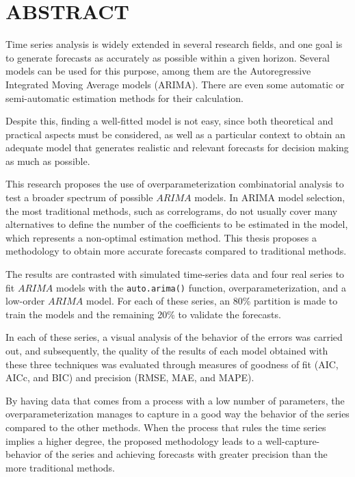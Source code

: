 \documentclass[
]{article}
\begin{document}
\cleardoublepage

\section*{ABSTRACT}

Time series analysis is widely extended in several research fields, and
one goal is to generate forecasts as accurately as possible within a
given horizon. Several models can be used for this purpose, among them
are the Autoregressive Integrated Moving Average models (ARIMA). There
are even some automatic or semi-automatic estimation methods for their
calculation.

Despite this, finding a well-fitted model is not easy, since both
theoretical and practical aspects must be considered, as well as a
particular context to obtain an adequate model that generates realistic
and relevant forecasts for decision making as much as possible.

This research proposes the use of overparameterization combinatorial
analysis to test a broader spectrum of possible \(ARIMA\) models. In
ARIMA model selection, the most traditional methods, such as
correlograms, do not usually cover many alternatives to define the
number of the coefficients to be estimated in the model, which
represents a non-optimal estimation method. This thesis proposes a
methodology to obtain more accurate forecasts compared to traditional
methods.

The results are contrasted with simulated time-series data and four real
series to fit \(ARIMA\) models with the \texttt{auto.arima()} function,
overparameterization, and a low-order \(ARIMA\) model. For each of these
series, an 80\% partition is made to train the models and the remaining
20\% to validate the forecasts.

In each of these series, a visual analysis of the behavior of the errors
was carried out, and subsequently, the quality of the results of each
model obtained with these three techniques was evaluated through
measures of goodness of fit (AIC, AICc, and BIC) and precision (RMSE,
MAE, and MAPE).

By having data that comes from a process with a low number of
parameters, the overparameterization manages to capture in a good way
the behavior of the series compared to the other methods. When the
process that rules the time series implies a higher degree, the proposed
methodology leads to a well-capture-behavior of the series and achieving
forecasts with greater precision than the more traditional methods.
\end{document}
